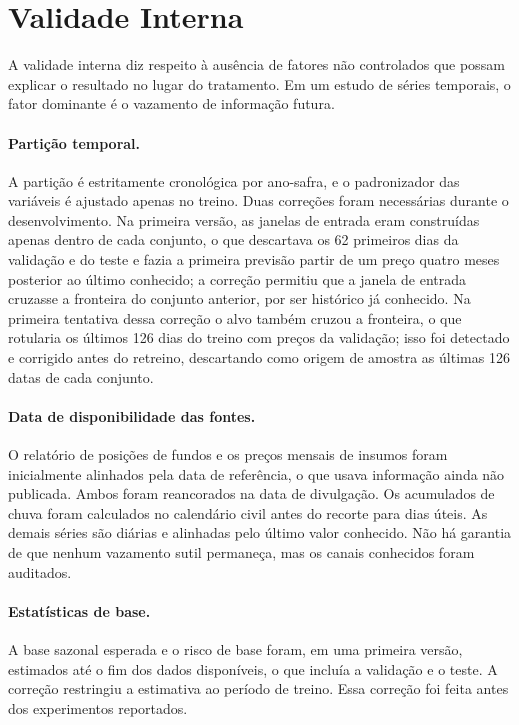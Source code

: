 \section{Validade Interna}\label{sec2:amc-interna}

A validade interna diz respeito à ausência de fatores não controlados que possam explicar o resultado no lugar do tratamento. Em um estudo de séries temporais, o fator dominante é o vazamento de informação futura.

\paragraph{Partição temporal.} A partição é estritamente cronológica por ano-safra, e o padronizador das variáveis é ajustado apenas no treino. Duas correções foram necessárias durante o desenvolvimento. Na primeira versão, as janelas de entrada eram construídas apenas dentro de cada conjunto, o que descartava os 62 primeiros dias da validação e do teste e fazia a primeira previsão partir de um preço quatro meses posterior ao último conhecido; a correção permitiu que a janela de entrada cruzasse a fronteira do conjunto anterior, por ser histórico já conhecido. Na primeira tentativa dessa correção o alvo também cruzou a fronteira, o que rotularia os últimos 126 dias do treino com preços da validação; isso foi detectado e corrigido antes do retreino, descartando como origem de amostra as últimas 126 datas de cada conjunto.

\paragraph{Data de disponibilidade das fontes.} O relatório de posições de fundos e os preços mensais de insumos foram inicialmente alinhados pela data de referência, o que usava informação ainda não publicada. Ambos foram reancorados na data de divulgação. Os acumulados de chuva foram calculados no calendário civil antes do recorte para dias úteis. As demais séries são diárias e alinhadas pelo último valor conhecido. Não há garantia de que nenhum vazamento sutil permaneça, mas os canais conhecidos foram auditados.

\paragraph{Estatísticas de base.} A base sazonal esperada e o risco de base foram, em uma primeira versão, estimados até o fim dos dados disponíveis, o que incluía a validação e o teste. A correção restringiu a estimativa ao período de treino. Essa correção foi feita antes dos experimentos reportados.

